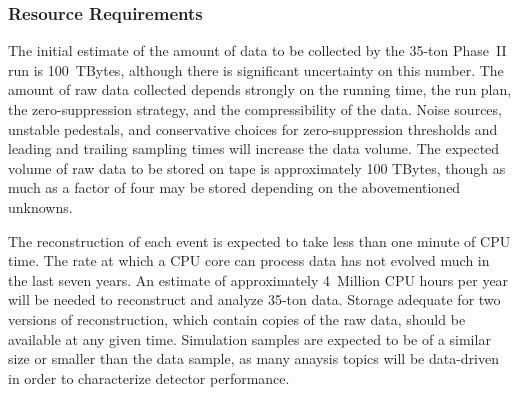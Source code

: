 \subsubsection{Resource Requirements}

The initial estimate of the amount of data to be collected by the 35-ton Phase~II run is 100~TBytes,
although there is significant uncertainty on this number.  The amount of raw data collected
depends strongly on the running time, the run plan, the zero-suppression strategy, and the
compressibility of the data.  Noise sources, unstable pedestals, and conservative choices for zero-suppression
thresholds and leading and trailing sampling times will increase the data volume.
The expected volume of raw data to be stored on tape is approximately 100 TBytes, though as much as a factor
of four may be stored depending on the abovementioned unknowns.

The reconstruction of each event is expected to take less than one minute of CPU time.  The rate at which
a CPU core can process data has not evolved much in the last seven years.  An estimate of approximately
4~Million CPU hours per year will be needed to reconstruct and analyze 35-ton data.  Storage adequate for
two versions of reconstruction, which contain copies of the raw data, should be available at any given time.
Simulation samples are expected to be of a similar size or smaller than the data sample, as many anaysis
topics will be data-driven in order to characterize detector performance.
